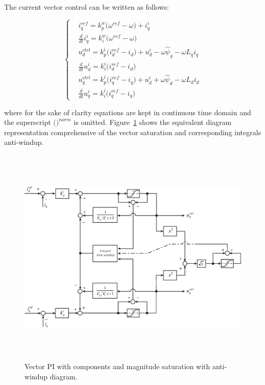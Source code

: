 \documentclass[11pt,a4paper,oneside]{book}
\numberwithin{equation}{section}
\theoremstyle{it}
\theoremstyle{definition}
\begin{document}
The current vector control can be written as follows:
\begin{mybox}
	\begin{equation}
		\left\lbrace \begin{aligned}
			&i_q^{ref} = k_p^w\Big(\omega^{ref} - \omega\Big) + i_{q}^{i} \\[6pt]
			&\frac{d}{dt} i_{q}^{i}= k_i^w\Big(\omega^{ref} - \omega\Big) \\[6pt]
			&u_d^{ctrl} =  k_p^i\Big(i_d^{ref} - i_d\Big) + u_d^i - \omega\hat{\psi}_q - \omega L_q i_q \\[6pt]
			&\frac{d}{dt} u_d^i= k_i^i\Big(i_d^{ref} - i_d\Big)\\[6pt]
			&u_q^{ctrl} =  k_p^i\Big(i_q^{ref} - i_q\Big) + u_d^i + \omega\hat{\psi}_d - \omega L_d i_d \\[6pt]
			&\frac{d}{dt} u_q^i= k_i^i\Big(i_q^{ref} - i_q\Big)
		\end{aligned}\right. 
	\end{equation}
\end{mybox}
where for the sake of clarity equations are kept in continuous time domain and the superscript $\Big(\Big)^{norm}$ is omitted. Figure~\ref{vector_pi_1} shows the equivalent diagram representation comprehensive of the vector saturation and corresponding integrals anti-windup. 
\begin{figure}[H]
	\centering
	\includegraphics[height= 300pt, angle = 0, 
	keepaspectratio]{figures/control_layout/vector_pi_2.eps}
	\captionsetup{width=0.5\textwidth, font=small}	
	\caption{Vector PI with components and magnitude saturation with anti-windup diagram.}
	\label{vector_pi_1}
\end{figure}
\end{document}
